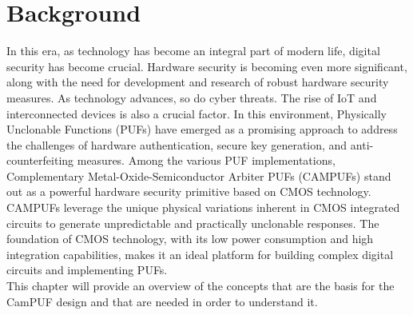 \chapter{Background}
In this era, as technology has become an integral part of modern life, digital security has become crucial. Hardware security is becoming even more significant, along with the need for development and research of robust hardware security measures.
As technology advances, so do cyber threats. The rise of IoT and interconnected devices is also a crucial factor.
In this environment, Physically Unclonable Functions (PUFs) have emerged as a promising approach to address the challenges of hardware authentication, secure key generation, and anti-counterfeiting measures. Among the various PUF implementations, Complementary Metal-Oxide-Semiconductor Arbiter PUFs (CAMPUFs) stand out as a powerful hardware security primitive based on CMOS technology.
\\
CAMPUFs leverage the unique physical variations inherent in CMOS integrated circuits to generate unpredictable and practically unclonable responses. The foundation of CMOS technology, with its low power consumption and high integration capabilities, makes it an ideal platform for building complex digital circuits and implementing PUFs.
\\
This chapter will provide an overview of the concepts that are the basis for the CamPUF design and that are needed in order to understand it.


